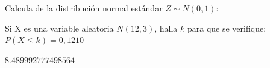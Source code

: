\documentclass[addpoints,spanish, 12pt,a4paper]{exam}
\begin{document}
\begin{questions}
         

\question Calcula de la distribución normal estándar $Z \sim N(0, 1)$:

\question[2] Si X es una variable aleatoria $N(12 , 3)$, halla $k$ para que se verifique: $P(X \leq k)=0,1210$
\begin{solution}
$8.489992777498564$
\end{solution}
        

\end{questions}
\end{document}
